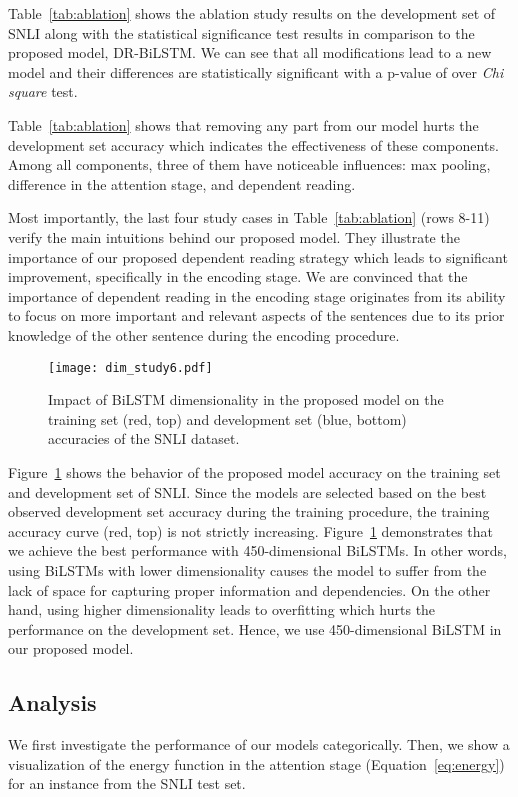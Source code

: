 \documentclass[11pt,a4paper]{article}
\begin{document}
	Table~\ref{tab:ablation} shows the ablation study results on the development set of SNLI along with the statistical significance test results in comparison to the proposed model, DR-BiLSTM. We can see that all modifications lead to a new model and their differences are statistically significant with a p-value of  over \emph{Chi square} test.
	
	Table~\ref{tab:ablation} shows that removing any part from our model hurts the development set accuracy which indicates the effectiveness of these components. Among all components, three of them have noticeable influences: max pooling, difference in the attention stage, and dependent reading. 
	
	Most importantly, the last four study cases in Table~\ref{tab:ablation} (rows 8-11) verify the main intuitions behind our proposed model. They illustrate the importance of our proposed dependent reading strategy which leads to significant improvement, specifically in the encoding stage. We are convinced that the importance of dependent reading in the encoding stage originates from its ability to focus on more important and relevant aspects of the sentences due to its prior knowledge of the other sentence during the encoding procedure.
	
	\begin{figure}[ht]
		\centering
		\texttt{[image: dim\_study6.pdf]}
		\caption{Impact of BiLSTM dimensionality in the proposed model on the training set (red, top) and development set (blue, bottom) accuracies of the SNLI dataset. \label{fig:dim:abl}}
	\end{figure}
	
	Figure~\ref{fig:dim:abl} shows the behavior of the proposed model accuracy on the training set and development set of SNLI. Since the models are selected based on the best observed development set accuracy during the training procedure, the training accuracy curve (red, top) is not strictly increasing. Figure~\ref{fig:dim:abl} demonstrates that we achieve the best performance with 450-dimensional BiLSTMs. In other words, using BiLSTMs with lower dimensionality causes the model to suffer from the lack of space for capturing proper information and dependencies. On the other hand, using higher dimensionality leads to overfitting which hurts the performance on the development set. Hence, we use 450-dimensional BiLSTM in our proposed model.
	
	\subsection{Analysis} \label{sec:err}
	We first investigate the performance of our models categorically. Then, we show a visualization of the energy function in the attention stage (Equation~\ref{eq:energy}) for an instance from the SNLI test set. 
	
\end{document}
